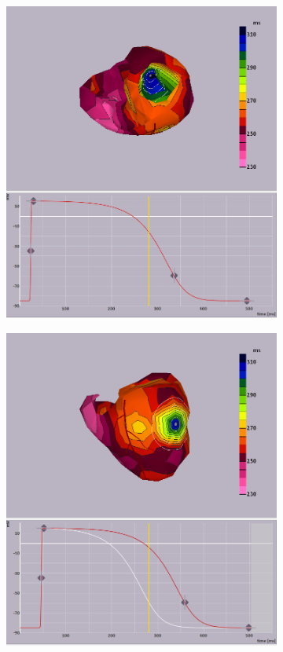 \documentclass[12pt]{article}
\begin{document}
\begin{figure}[H]
\begin{subfigure}{0.45\textwidth}
	\caption{}
	\label{APD:epi2}
	\end{subfigure}
	\begin{subfigure}{0.45\textwidth}
		\centering
		\includegraphics[width = \textwidth]{Figures/EndoADP.png}
		\caption{}
		\label{APD:endo}
	\end{subfigure}
	\begin{subfigure}{0.45\textwidth}
		\centering
		\includegraphics[width = \textwidth]{Figures/EpiChangedADP_1.png}

\end{subfigure}
\end{figure}
\end{document}
